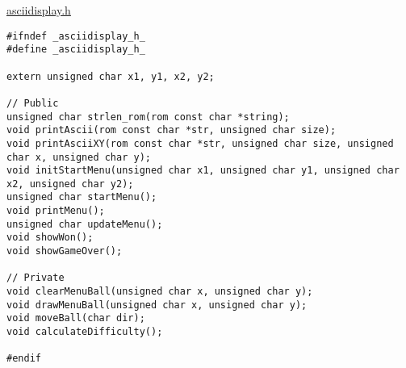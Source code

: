 \underline{asciidisplay.h}
\begin{lstlisting}
#ifndef _asciidisplay_h_
#define _asciidisplay_h_

extern unsigned char x1, y1, x2, y2;

// Public
unsigned char strlen_rom(rom const char *string);
void printAscii(rom const char *str, unsigned char size);
void printAsciiXY(rom const char *str, unsigned char size, unsigned char x, unsigned char y);
void initStartMenu(unsigned char x1, unsigned char y1, unsigned char x2, unsigned char y2);
unsigned char startMenu();
void printMenu();
unsigned char updateMenu();
void showWon();
void showGameOver();

// Private
void clearMenuBall(unsigned char x, unsigned char y);
void drawMenuBall(unsigned char x, unsigned char y);
void moveBall(char dir);
void calculateDifficulty();

#endif
\end{lstlisting}

